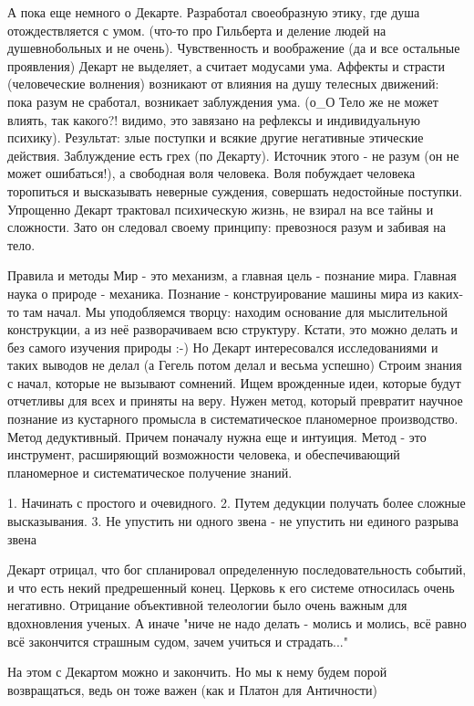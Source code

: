 А пока еще немного о Декарте.
Разработал своеобразную этику, где душа отождествляется с умом. (что-то про Гильберта и деление людей на душевнобольных и не очень). Чувственность и воображение (да и все остальные проявления) Декарт не выделяет, а считает модусами ума. Аффекты и страсти (человеческие волнения) возникают от влияния на душу телесных движений: пока разум не сработал, возникает заблуждения ума. (о_О Тело же не может влиять, так какого?! видимо, это завязано на рефлексы и индивидуальную психику). Результат: злые поступки и всякие другие негативные этические действия. Заблуждение есть грех (по Декарту). Источник этого - не разум (он не может ошибаться!), а свободная воля человека. Воля побуждает человека торопиться и высказывать неверные суждения, совершать недостойные поступки. Упрощенно Декарт трактовал психическую жизнь, не взирал на все тайны и сложности. Зато он следовал своему принципу: превознося разум и забивая на тело.

Правила и методы
Мир - это механизм, а главная цель - познание мира. Главная наука о природе - механика. Познание - конструирование машины мира из каких-то там начал. Мы уподобляемся творцу: находим основание для мыслительной конструкции, а из неё разворачиваем всю структуру. Кстати, это можно делать и без самого изучения природы :-) Но Декарт интересовался исследованиями и таких выводов не делал (а Гегель потом делал и весьма успешно)
Строим знания с начал, которые не вызывают сомнений. Ищем врожденные идеи, которые будут отчетливы для всех и приняты на веру. Нужен метод, который превратит научное познание из кустарного промысла в систематическое планомерное производство. Метод дедуктивный. Причем поначалу нужна еще и интуиция. Метод - это инструмент, расширяющий возможности человека, и обеспечивающий планомерное и систематическое получение знаний.

	1. Начинать с простого и очевидного. 
	2. Путем дедукции получать более сложные высказывания. 
	3. Не упустить ни одного звена - не упустить ни единого разрыва звена

Декарт отрицал, что бог спланировал определенную последовательность событий, и что есть некий предрешенный конец. Церковь к его системе относилась очень негативно. Отрицание объективной телеологии было очень важным для вдохновления ученых. А иначе "ниче не надо делать - молись и молись, всё равно всё закончится страшным судом, зачем учиться и страдать..."

На этом с Декартом можно и закончить. Но мы к нему будем порой возвращаться, ведь он тоже важен (как и Платон для Античности)


